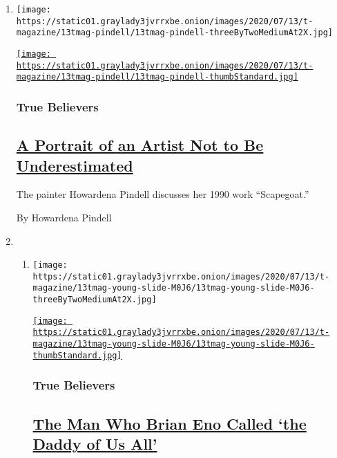 \begin{enumerate}
\def\labelenumi{\arabic{enumi}.}
\item
  \texttt{[image: https://static01.graylady3jvrrxbe.onion/images/2020/07/13/t-magazine/13tmag-pindell/13tmag-pindell-threeByTwoMediumAt2X.jpg]}

  \href{/2020/07/24/t-magazine/howardena-pindell.html}{\texttt{[image: https://static01.graylady3jvrrxbe.onion/images/2020/07/13/t-magazine/13tmag-pindell/13tmag-pindell-thumbStandard.jpg]}}

  \hypertarget{true-believers}{%
  \subsubsection{True Believers}\label{true-believers}}

  \hypertarget{a-portrait-of-an-artist-not-to-be-underestimated}{%
  \subsection{\texorpdfstring{\href{/2020/07/24/t-magazine/howardena-pindell.html}{A
  Portrait of an Artist Not to Be
  Underestimated}}{A Portrait of an Artist Not to Be Underestimated}}\label{a-portrait-of-an-artist-not-to-be-underestimated}}

  The painter Howardena Pindell discusses her 1990 work ``Scapegoat.''

  By Howardena Pindell
\item
  \begin{enumerate}
  \def\labelenumii{\arabic{enumii}.}
  \item
    \texttt{[image: https://static01.graylady3jvrrxbe.onion/images/2020/07/13/t-magazine/13tmag-young-slide-M0J6/13tmag-young-slide-M0J6-threeByTwoMediumAt2X.jpg]}

    \href{/2020/07/22/t-magazine/la-monte-young.html}{\texttt{[image: https://static01.graylady3jvrrxbe.onion/images/2020/07/13/t-magazine/13tmag-young-slide-M0J6/13tmag-young-slide-M0J6-thumbStandard.jpg]}}

    \hypertarget{true-believers-1}{%
    \subsubsection{True Believers}\label{true-believers-1}}

    \hypertarget{the-man-who-brian-eno-called-the-daddy-of-us-all}{%
    \subsection{\texorpdfstring{\href{/2020/07/22/t-magazine/la-monte-young.html}{The
    Man Who Brian Eno Called `the Daddy of Us
    All'}}{The Man Who Brian Eno Called `the Daddy of Us All'}}\label{the-man-who-brian-eno-called-the-daddy-of-us-all}}


\end{enumerate}
\end{enumerate}
